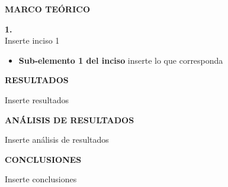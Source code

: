 \documentclass[12pt]{article}
\begin{document}
	\newpage
	
	
	\begin{center}
		\textbf{\large MARCO TEÓRICO}\\
	\end{center}
	
	\textbf{1. }\\
	
	Inserte inciso 1
	
	\begin{itemize}
		\item \textbf{Sub-elemento 1 del inciso } inserte lo que corresponda
		
	\end{itemize}
	
	\newpage
	
	\begin{center}
		\textbf{\large RESULTADOS}\\
	\end{center}
	
	Inserte resultados
	
	\newpage
	
	\begin{center}
		\textbf{\large ANÁLISIS DE RESULTADOS}\\
	\end{center}
	
	Inserte análisis de resultados
	
	\newpage
	
	\begin{center}
		\textbf{\large CONCLUSIONES}\\
	\end{center}
	
	Inserte conclusiones
	
	\newpage
	
\end{document}

